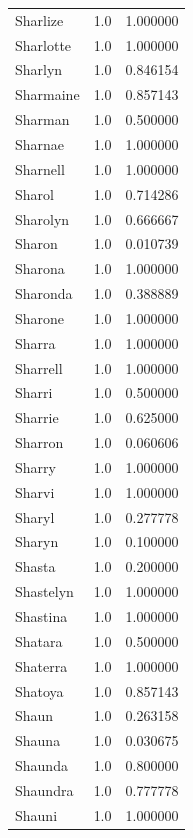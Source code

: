 \documentclass[
  letterpaper,
  DIV=11,
  numbers=noendperiod]{scrreprt}
\begin{document}
\begin{tabular}{lrr}
Sharlize        &   1.0 &   1.000000 \\
Sharlotte       &   1.0 &   1.000000 \\
Sharlyn         &   1.0 &   0.846154 \\
Sharmaine       &   1.0 &   0.857143 \\
Sharman         &   1.0 &   0.500000 \\
Sharnae         &   1.0 &   1.000000 \\
Sharnell        &   1.0 &   1.000000 \\
Sharol          &   1.0 &   0.714286 \\
Sharolyn        &   1.0 &   0.666667 \\
Sharon          &   1.0 &   0.010739 \\
Sharona         &   1.0 &   1.000000 \\
Sharonda        &   1.0 &   0.388889 \\
Sharone         &   1.0 &   1.000000 \\
Sharra          &   1.0 &   1.000000 \\
Sharrell        &   1.0 &   1.000000 \\
Sharri          &   1.0 &   0.500000 \\
Sharrie         &   1.0 &   0.625000 \\
Sharron         &   1.0 &   0.060606 \\
Sharry          &   1.0 &   1.000000 \\
Sharvi          &   1.0 &   1.000000 \\
Sharyl          &   1.0 &   0.277778 \\
Sharyn          &   1.0 &   0.100000 \\
Shasta          &   1.0 &   0.200000 \\
Shastelyn       &   1.0 &   1.000000 \\
Shastina        &   1.0 &   1.000000 \\
Shatara         &   1.0 &   0.500000 \\
Shaterra        &   1.0 &   1.000000 \\
Shatoya         &   1.0 &   0.857143 \\
Shaun           &   1.0 &   0.263158 \\
Shauna          &   1.0 &   0.030675 \\
Shaunda         &   1.0 &   0.800000 \\
Shaundra        &   1.0 &   0.777778 \\
Shauni          &   1.0 &   1.000000 \\

\end{tabular}
\end{document}
